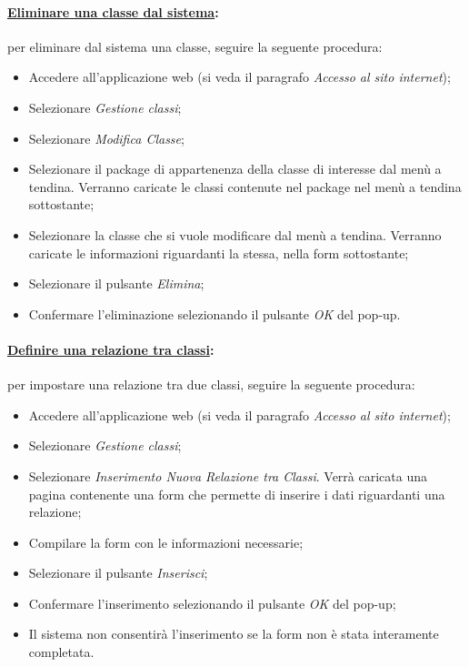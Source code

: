\paragraph{\underline{Eliminare una classe dal sistema}:}
per eliminare dal sistema una classe, seguire la seguente procedura:
\begin{itemize}
\item Accedere all'applicazione web (si veda il paragrafo \textit{Accesso al sito internet});
\item Selezionare \textit{Gestione classi};
\item Selezionare \textit{Modifica Classe};
\item Selezionare il package\g{} di appartenenza della classe di interesse dal menù a tendina. Verranno caricate le classi contenute nel package\g{} nel menù a tendina sottostante;
\item Selezionare la classe che si vuole modificare dal menù a tendina. Verranno caricate le informazioni riguardanti la stessa, nella form sottostante;
\item Selezionare il pulsante \textit{Elimina};
\item Confermare l'eliminazione selezionando il pulsante \textit{OK} del pop-up.
\end{itemize}

\paragraph{\underline{Definire una relazione tra classi}:}
per impostare una relazione tra due classi, seguire la seguente procedura:
\begin{itemize}
\item Accedere all'applicazione web (si veda il paragrafo \textit{Accesso al sito internet});
\item Selezionare \textit{Gestione classi};
\item Selezionare \textit{Inserimento Nuova Relazione tra Classi}. Verrà caricata una pagina contenente una form che permette di inserire i dati riguardanti una relazione;
\item Compilare la form con le informazioni necessarie;
\item Selezionare il pulsante \textit{Inserisci};
\item Confermare l'inserimento selezionando il pulsante \textit{OK} del pop-up;
\item Il sistema non consentirà l'inserimento se la form non è stata interamente completata.
\end{itemize}

